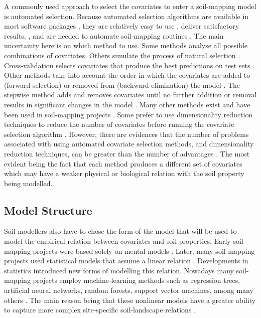 A commonly used approach to select the covariates to enter a soil-mapping model is automated selection.
Because automated selection algorithms are available in most software packages \cite{Harrell2001a},
they are relatively easy to use \cite{DraperEtAl1971}, deliver satisfactory results,
\cite{HenglEtAl2004}, and are needed to automate soil-mapping routines \cite{HenglEtAl2014}. The
main uncertainty here is on which method to use. Some methods analyse all possible combinations of
covariates. Others simulate the process of natural selection \cite{AndersenEtAl2010}.
Cross-validation selects covariates that produce the best predictions on test sets
\cite{GuyonEtAl2003}. Other methods take into account the order in which the covariates are added
to (forward selection) or removed from (backward elimination) the model \cite{LarkEtAl2007a}. 
The stepwise method adds and removes covariates until no further addition or removal results in
significant changes in the model \cite{DraperEtAl1998}. Many other methods exist and have been
used in soil-mapping projects \cite{PoggioEtAl2013,NussbaumEtAl2014}. Some prefer to use
dimensionality reduction techniques to reduce the number of covariates \cite{Massy1965} before
running the covariate selection algorithm \cite{tenCatenEtAl2011a, HenglEtAl2014}. However, there
are evidences that the number of problems associated with using automated covariate selection
methods, and dimensionality reduction techniques, can be greater than the number of advantages 
\cite{FarrarEtAl1967, Jackson1993, Chatfield1995, Edirisooriya1995, Harrell2001a, Jolliffe2002, 
Peres-NetoEtAl2005, LarkEtAl2007a}. The most evident being the fact that each method produces a
 different set of covariates which may have a weaker physical or biological relation with the soil 
property being modelled.

\subsection{Model Structure}

Soil modellers also have to chose the form of the model that will be used to model the
empirical relation between covariates and soil properties. Early soil-mapping projects were based
solely on mental models \cite{Hudson1992}. Later, many soil-mapping projects used statistical
models that assume a linear relation \cite{MooreEtAl1993, OdehEtAl1994}. Developments in
statistics introduced new forms of modelling this relation. Nowadays many soil-mapping projects
employ machine-learning methods such as regression trees, artificial neural networks, random forests,
support vector machines, among many others \cite{HeungEtAl2016}. The main reason being that these
nonlinear models have a greater ability to capture more complex site-specific soil-landscape relations
\cite{Grunwald2009}.

